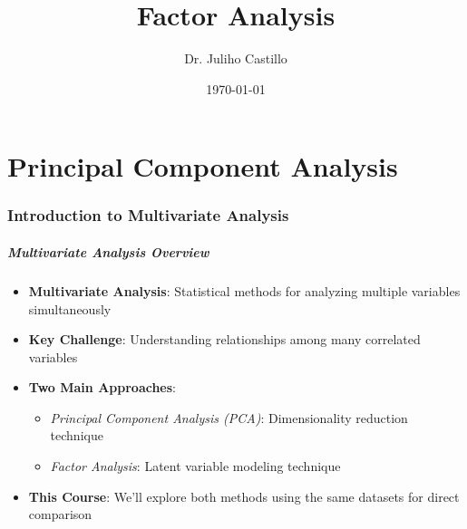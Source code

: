 \documentclass[aspectratio=169]{beamer}
\title{Factor Analysis}
\author{Dr. Juliho Castillo}
\institute{Tecnológico de Monterrey}
\date{\today}
\begin{document}
\begin{frame}
    \titlepage
\end{frame}

\begin{frame}
    \tableofcontents
\end{frame}


\part{Principal Component Analysis}

\begin{frame}
    \partpage
\end{frame}

\section{Introduction to Multivariate Analysis}

\begin{frame}[fragile]
    \frametitle{Multivariate Analysis Overview}
    \begin{itemize}
        \item \textbf{Multivariate Analysis}: Statistical methods for analyzing multiple variables simultaneously \pause
        \item \textbf{Key Challenge}: Understanding relationships among many correlated variables \pause
        \item \textbf{Two Main Approaches}: 
              \begin{itemize}
                  \item \textit{Principal Component Analysis (PCA)}: Dimensionality reduction technique \pause
                  \item \textit{Factor Analysis}: Latent variable modeling technique \pause
              \end{itemize}
        \item \textbf{This Course}: We'll explore both methods using the same datasets for direct comparison
    \end{itemize}
\end{frame}
\end{document}
